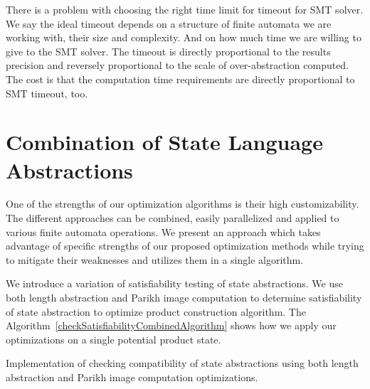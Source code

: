 There is a problem with choosing the right time limit for timeout for SMT solver. We say the ideal timeout depends on a structure of finite automata we are working with, their size and complexity. And on how much time we are willing to give to the SMT solver. The timeout is directly proportional to the results precision and reversely proportional to the scale of over-abstraction computed. The cost is that the computation time requirements are directly proportional to SMT timeout, too.


\section{Combination of State Language Abstractions}

One of the strengths of our optimization algorithms is their high customizability. The different approaches can be combined, easily parallelized and applied to various finite automata operations. We present an approach which takes advantage of specific strengths of our proposed optimization methods while trying to mitigate their weaknesses and utilizes them in a single algorithm.

We introduce a variation of satisfiability testing of state abstractions. We use both length abstraction and Parikh image computation to determine satisfiability of state abstraction to optimize product construction algorithm. The Algorithm~\ref{checkSatisfiabilityCombinedAlgorithm} shows how we apply our optimizations on a single potential product state.

\begin{algorithm}[ht]
\caption{Implementation of checking compatibility of state abstractions using both length abstraction and Parikh image computation optimizations.}\label{checkSatisfiabilityCombinedAlgorithm}



\DontPrintSemicolon

\end{algorithm}


